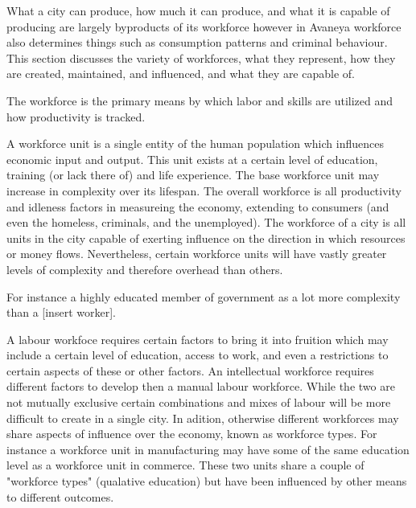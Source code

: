 


What a city can produce, how much it can produce, and what it is capable of producing are largely byproducts of its workforce however in Avaneya workforce also determines things such as consumption patterns and criminal behaviour. This section discusses the variety of workforces, what they represent, how they are created, maintained, and influenced, and what they are capable of. 

The workforce is the primary means by which labor and skills are utilized and how productivity is tracked. %


A workforce unit is a single entity of the human population which influences economic input and output. This unit exists at a certain level of education, training (or lack there of) and life experience. The base workforce unit may increase in complexity over its lifespan. The overall workforce is all productivity and idleness factors in measureing the economy, extending to consumers (and even the homeless, criminals, and the unemployed). The workforce of a city is all units in the city capable of exerting influence on the direction in which resources or money flows. Nevertheless, certain workforce units will have vastly greater levels of complexity and therefore overhead than others. 

For instance a highly educated member of government as a lot more complexity than a [insert worker]. %

A labour workfoce requires certain factors to bring it into fruition which may include a certain level of education, access to work, and even a restrictions to certain aspects of these or other factors. An intellectual workforce requires different factors to develop then a manual labour workforce. While the two are not mutually exclusive certain combinations and mixes of labour will be more difficult to create in a single city. In adition, otherwise different workforces may share aspects of influence over the economy, known as workforce types. For instance a workforce unit in manufacturing may have some of the same education level as a workforce unit in commerce. These two units share a couple of "workforce types" (qualative education) but have been influenced by other means to different outcomes. 


